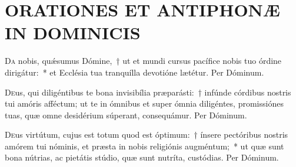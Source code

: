 \documentclass[vesperale_romanum.tex]{subfiles}
\begin{document}

\section*{ORATIONES ET ANTIPHONÆ IN DOMINICIS}

\subtitle{per ordinem dispositæ a quarta post Pentecosten usque ad Adventum.}





\oratio

\lettrine{D}{a} nobis, quǽsumus Dómine,~† ut et mundi cursus pacífice nobis tuo órdine dirigátur:~* et Ecclésia tua tranquílla devotióne lætétur. Per Dóminum.



\oratio

\lettrine{D}{e}us, qui diligéntibus te bona invisibília præparásti:~† infúnde córdibus nostris tui amóris afféctum; ut te in ómnibus et super ómnia diligéntes, promissiónes tuas, quæ omne desidérium súperant, consequámur. Per Dóminum.



\oratio

\lettrine{D}{e}us virtútum, cujus est totum quod est óptimum:~† ínsere pectóribus nostris amórem tui nóminis, et præsta in nobis religiónis augméntum;~* ut quæ sunt bona nútrias, ac pietátis stúdio, quæ sunt nutríta, custódias.
Per Dóminum.


\end{document}
